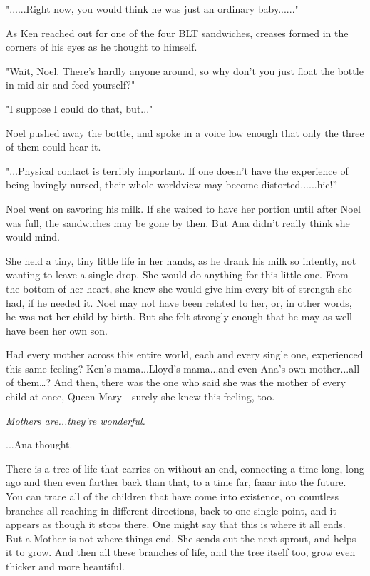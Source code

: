 \documentclass[
]{article}
\begin{document}
"......Right now, you would think he was just an ordinary baby......"

As Ken reached out for one of the four BLT sandwiches, creases formed in
the corners of his eyes as he thought to himself.

"Wait, Noel. There's hardly anyone around, so why don't you just float
the bottle in mid-air and feed yourself?"

"I suppose I could do that, but..."

Noel pushed away the bottle, and spoke in a voice low enough that only
the three of them could hear it.

"...Physical contact is terribly important. If one doesn't have the
experience of being lovingly nursed, their whole worldview may become
distorted......hic!''

Noel went on savoring his milk. If she waited to have her portion until
after Noel was full, the sandwiches may be gone by then. But Ana didn't
really think she would mind.

She held a tiny, tiny little life in her hands, as he drank his milk so
intently, not wanting to leave a single drop. She would do anything for
this little one. From the bottom of her heart, she knew she would give
him every bit of strength she had, if he needed it. Noel may not have
been related to her, or, in other words, he was not her child by birth.
But she felt strongly enough that he may as well have been her own son.

Had every mother across this entire world, each and every single one,
experienced this same feeling? Ken's mama...Lloyd's mama...and even
Ana's own mother...all of them\ldots? And then, there was the one who
said she was the mother of every child at once, Queen Mary - surely she
knew this feeling, too.

\emph{Mothers are...they're wonderful.}

...Ana thought.

There is a tree of life that carries on without an end, connecting a
time long, long ago and then even farther back than that, to a time far,
faaar into the future. You can trace all of the children that have come
into existence, on countless branches all reaching in different
directions, back to one single point, and it appears as though it stops
there. One might say that this is where it all ends. But a Mother is not
where things end. She sends out the next sprout, and helps it to grow.
And then all these branches of life, and the tree itself too, grow even
thicker and more beautiful.
\end{document}

